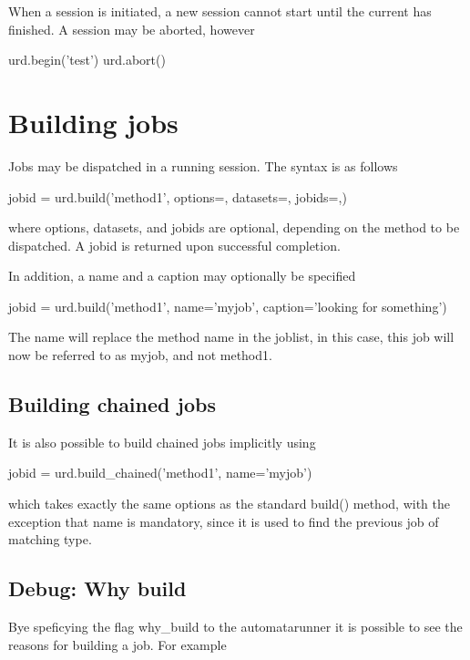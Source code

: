 When a session is initiated, a new session cannot start until the
current has finished.  A session may be aborted, however

\begin{python}
  urd.begin('test')
  urd.abort()
\end{python}



\section{Building jobs}

Jobs may be dispatched in a running session.  The syntax is as follows

\begin{python}
  jobid = urd.build('method1', options={}, datasets={}, jobids={},)
\end{python}
where options, datasets, and jobids are optional, depending on the
method to be dispatched.  A jobid is returned upon successful
completion.

In addition, a name and a caption may optionally be specified

\begin{python}
  jobid = urd.build('method1', name='myjob', caption='looking for something')
\end{python}

The name will replace the method name in the joblist, in this case,
this job will now be referred to as myjob, and not method1.  




\subsection{Building chained jobs}
It is also possible to build chained jobs implicitly using

\begin{python}
  jobid = urd.build_chained('method1', name='myjob')
\end{python}
which takes exactly the same options as the standard build() method,
with the exception that name is mandatory, since it is used to find
the previous job of matching type.


\subsection{Debug:  Why build}

Bye speficying the flag why\_build to the automatarunner it is
possible to see the reasons for building a job.  For example


